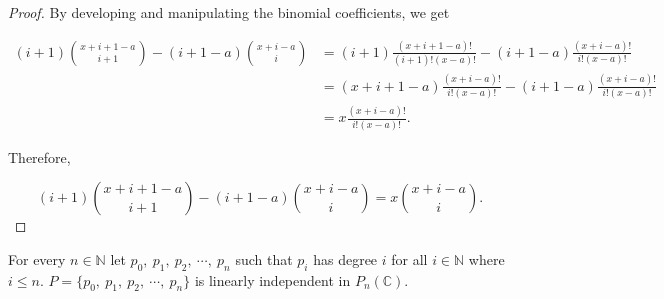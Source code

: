 \documentclass[12pt]{article}
\begin{document}
\vspace{20px}

\begin{proof}

    By developing and manipulating the binomial coefficients, we get

    \begin{align*}
        (i+1)\binom{x+i+1-a}{i+1} - (i+1-a)\binom{x+i-a}{i} & = (i+1)\frac{(x+i+1-a)!}{(i+1)!(x-a)!} - (i+1-a)\frac{(x+i-a)!}{i!(x-a)!} \\
                                                            & = (x+i+1-a)\frac{(x+i-a)!}{i!(x-a)!} - (i+1-a)\frac{(x+i-a)!}{i!(x-a)!}   \\
                                                            & = x\frac{(x+i-a)!}{i!(x-a)!}.
    \end{align*}

    Therefore,

    $$
        \boxed{(i+1)\binom{x+i+1-a}{i+1} - (i+1-a)\binom{x+i-a}{i} = x\binom{x+i-a}{i}}.
    $$

\end{proof}

\vspace{20px}

\begin{theorem}
    \label{polynomial_li}

    For every $n \in \mathbb{N}$ let $p_0,\ p_1,\ p_2,\ \cdots,\ p_n$ such that $p_i$ has degree $i$ for all $i \in \mathbb{N}$ where $i \leq n$. $\displaystyle P = \{ p_0,\ p_1,\ p_2,\ \cdots,\ p_n \}$ is linearly independent in $P_n(\mathbb{C})$.

\end{theorem}
\end{document}
